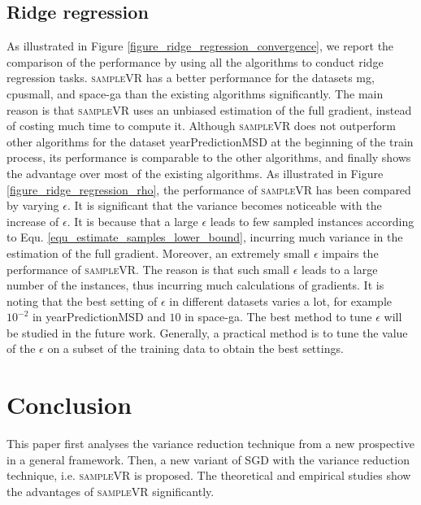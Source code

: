 \documentclass[letterpaper]{article}
\begin{document}
\subsection{Ridge regression}
\label{sect_performance_evaluation_convergence}
As illustrated in Figure \ref{figure_ridge_regression_convergence}, we report the comparison of the performance by using all the algorithms to  conduct  ridge regression tasks. \textsc{sampleVR} has a better performance for the datasets mg, cpusmall, and space-ga than the existing algorithms significantly. The main reason is that \textsc{sampleVR} uses an unbiased estimation of the full gradient, instead of costing much time to compute it.  Although \textsc{sampleVR} does not outperform other algorithms for the dataset yearPredictionMSD at the beginning of the train process, its performance is comparable to the other algorithms, and finally shows the advantage over most of the existing algorithms.  As illustrated in Figure \ref{figure_ridge_regression_rho}, the performance of \textsc{sampleVR} has been compared by varying $\epsilon$. It is significant that the variance becomes noticeable with the increase of $\epsilon$. It is because that a large $\epsilon$ leads to few sampled instances  according to Equ. \ref{equ_estimate_samples_lower_bound}, incurring much variance in the estimation of the full gradient. Moreover,  an extremely small  $\epsilon$  impairs  the performance of \textsc{sampleVR}. The reason is that such small $\epsilon$ leads to a large number of the instances, thus incurring  much calculations of gradients.   It is noting that the best setting of $\epsilon$  in different datasets varies a lot, for example $10^{-2}$ in yearPredictionMSD and $10$ in space-ga. The best method to tune $\epsilon$ will be studied in the future work. Generally, a practical method  is to  tune the value of the $\epsilon$ on a subset of the training data to obtain the best settings.



\section{Conclusion}
\label{sect_conclusion}
This paper first analyses the  variance reduction technique   from a new prospective in a general framework. Then, a new variant of SGD with the variance reduction technique, i.e. \textsc{sampleVR} is proposed. The theoretical and  empirical studies show the advantages of \textsc{sampleVR} significantly.




\end{document}
